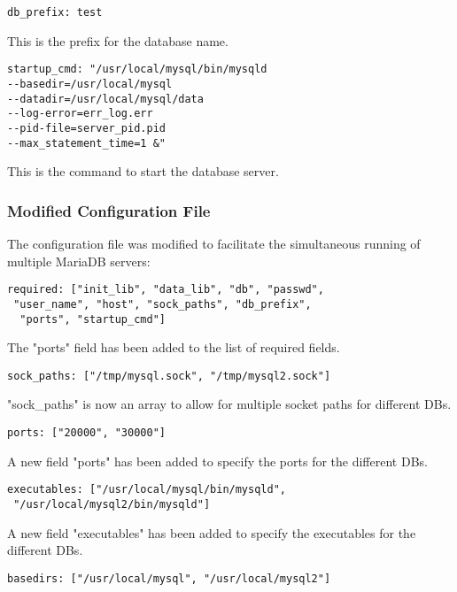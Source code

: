 \documentclass[sigconf]{acmart}
\begin{document}
\begin{verbatim}
db_prefix: test
\end{verbatim}

This is the prefix for the database name.

\begin{verbatim}
startup_cmd: "/usr/local/mysql/bin/mysqld 
--basedir=/usr/local/mysql 
--datadir=/usr/local/mysql/data 
--log-error=err_log.err 
--pid-file=server_pid.pid 
--max_statement_time=1 &"
\end{verbatim}

This is the command to start the database server.

\subsubsection{Modified Configuration File}

The configuration file was modified to facilitate the simultaneous running of multiple MariaDB servers:

\begin{verbatim}
required: ["init_lib", "data_lib", "db", "passwd",
 "user_name", "host", "sock_paths", "db_prefix",
  "ports", "startup_cmd"]
\end{verbatim}

The "ports" field has been added to the list of required fields.

\begin{verbatim}
sock_paths: ["/tmp/mysql.sock", "/tmp/mysql2.sock"]
\end{verbatim}

"sock\_paths" is now an array to allow for multiple socket paths for different DBs.

\begin{verbatim}
ports: ["20000", "30000"]
\end{verbatim}

A new field "ports" has been added to specify the ports for the different DBs.

\begin{verbatim}
executables: ["/usr/local/mysql/bin/mysqld",
 "/usr/local/mysql2/bin/mysqld"]
\end{verbatim}

A new field "executables" has been added to specify the executables for the different DBs.

\begin{verbatim}
basedirs: ["/usr/local/mysql", "/usr/local/mysql2"]
\end{verbatim}
\end{document}
